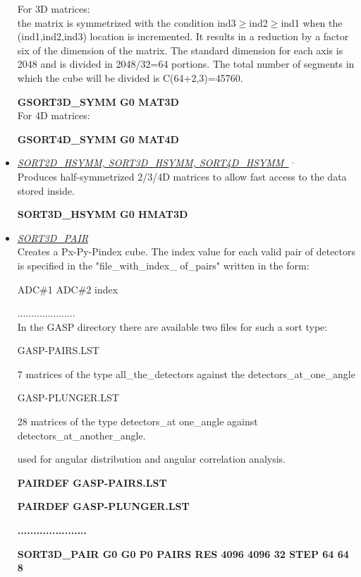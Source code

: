 \begin{itemize}
	For 3D matrices:\\
	the matrix is symmetrized with the condition ind3$\geq$ind2$\geq$ind1 
	when
	the (ind1,ind2,ind3) location is incremented.
	It results in a  reduction by a factor six of the dimension of
	the matrix.
	The standard dimension for 
	each axis is 2048 and is divided in 2048/32=64 portions. The total 
	number of segments in which the cube will be divided is C(64+2,3)=45760.

	\hskip1cm{\bf GSORT3D\_SYMM G0 MAT3D}\\

	For 4D matrices:

	\hskip1cm{\bf GSORT4D\_SYMM G0 MAT4D}

 \item	{\it\underline{SORT2D\_HSYMM, SORT3D\_HSYMM, SORT4D\_HSYMM~}}
	\footnotemark[4]$^,$\footnotemark[5] \\

	Produces half-symmetrized 2/3/4D matrices to allow fast access to the
	data stored inside.

	\hskip1cm{\bf SORT3D\_HSYMM G0 HMAT3D}

 \item	{\it\underline{SORT3D\_PAIR}} \\

	Creates a Px-Py-Pindex cube. The index value for each
	valid pair of detectors is specified in the "file\_with\_index\_
	of\_pairs" written in the form: 

		ADC\#1	ADC\#2	index 

		.....................\\
	In the GASP directory there are available two files for such a
	sort type:

	GASP-PAIRS.LST~~~~~~~~~~~~\parbox[t]{9cm}{7 matrices of the type 
				all\_the\_detectors
			     	against the detectors\_at\_one\_angle}

	GASP-PLUNGER.LST~~~~~~\parbox[t]{9cm}{28 matrices of the type detectors\_at
			     	one\_angle 
				against detectors\_at\_another\_angle.}

	used for angular distribution and angular correlation analysis.

	\hskip1cm{\bf PAIRDEF GASP-PAIRS.LST}

	\hskip1cm{\bf PAIRDEF GASP-PLUNGER.LST}

	\hskip1cm{\bf ......................}

	\hskip1cm{\bf SORT3D\_PAIR G0 G0 P0 PAIRS RES 4096 4096 32  STEP 64 64 8}


\end{itemize}
